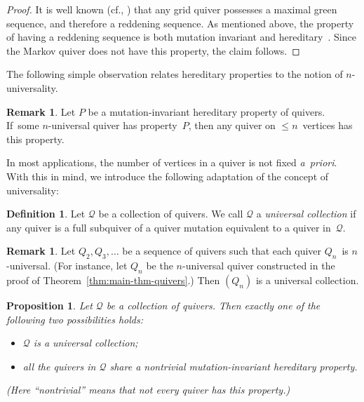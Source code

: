 \documentclass[10pt]{amsart}
\newtheorem{proposition}[theorem]{Proposition}
\theoremstyle{definition}
\newtheorem{definition}[theorem]{Definition}
\newtheorem{remark}[theorem]{Remark}
\newcommand{\cf}{cf.}
\begin{document}
\begin{proof}
It is well known (\cf \cite[Section~1]{marsh-scott}, \cite[Section~5]{keller-maxgreen}) that any grid quiver possesses a maximal green sequence, and therefore a reddening sequence. As mentioned above, the property of having a reddening sequence is both mutation invariant and hereditary~\cite[\emph{loc.\ cit.}]{muller-max-green}. Since the Markov quiver does not have this property, the claim follows. 
\end{proof}

The following simple observation relates hereditary properties to the notion of $n$-universality. 


\begin{remark}
\label{rem:enough-n-universal}
Let $P$ be a mutation-invariant hereditary property of quivers. 
If~some $n$-universal quiver has property~$P$, then any quiver on $\le n$~vertices has this property.
\end{remark}

In most applications, the number of vertices in a quiver is not fixed \emph{a~priori}. With this in mind, we introduce the following adaptation of the concept of universality: 

\begin{definition}
\label{def:universal-collection}
Let $\mathcal{Q}$ be a collection of quivers. We call $\mathcal{Q}$ a \emph{universal collection} if any quiver is a full subquiver of a quiver mutation equivalent to a quiver in~$\mathcal{Q}$. 
\end{definition}


\begin{remark}
\label{rem:universal-from-n-universal}
Let $Q_2, Q_3,\dots$ be a sequence of quivers such that each quiver $Q_n$~is \hbox{$n$-universal}. (For instance, let $Q_n$ be the $n$-universal quiver constructed in the proof of Theorem~\ref{thm:main-thm-quivers}.) Then $(Q_n)$ is a universal collection. 
\end{remark}


\begin{proposition}
\label{prop:universal-hereditary-alternative}
Let $\mathcal{Q}$ be a collection of quivers. Then exactly one of the following two possibilities holds:
\begin{itemize}%
\item
$\mathcal{Q}$ is a universal collection; 
\item
all the quivers in $\mathcal{Q}$ share a nontrivial mutation-invariant hereditary property.
\end{itemize}
(Here ``nontrivial'' means that not every quiver has this property.) 
\end{proposition}
\end{document}

